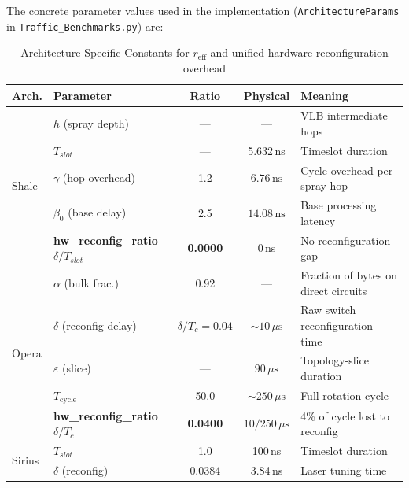 \documentclass{article}
\begin{document}
    \noindent
    The concrete parameter values used in the implementation (\texttt{ArchitectureParams} in \texttt{Traffic\_Benchmarks.py}) are:

    \begin{table}[H]
        \centering
        \caption{Architecture-Specific Constants for $r_{\text{eff}}$ and unified hardware reconfiguration overhead}
        \begin{tabular}{|l|l|c|c|l|}
            \hline
            \textbf{Arch.} & \textbf{Parameter} & \textbf{Ratio} & \textbf{Physical} & \textbf{Meaning} \\
            \hline
            \multirow{5}{*}{Shale}
                & $h$ (spray depth)      & ---                & ---               & VLB intermediate hops \\
                & $T_{slot}$             & ---                & 5.632\,ns         & Timeslot duration \\
                & $\gamma$ (hop overhead)& 1.2                & $6.76\,\text{ns}$ & Cycle overhead per spray hop \\
                & $\beta_0$ (base delay) & 2.5                & $14.08\,\text{ns}$& Base processing latency \\
                & \textbf{hw\_reconfig\_ratio} $\delta/T_{slot}$ & \textbf{0.0000} & 0\,ns & No reconfiguration gap \\
            \hline
            \multirow{5}{*}{Opera}
                & $\alpha$ (bulk frac.)  & 0.92               & ---               & Fraction of bytes on direct circuits \\
                & $\delta$ (reconfig delay)& $\delta/T_c = 0.04$& ${\sim}10\,\mu\text{s}$ & Raw switch reconfiguration time \\
                & $\varepsilon$ (slice)  & ---                & $90\,\mu\text{s}$ & Topology-slice duration \\
                & $T_{\text{cycle}}$     & 50.0               & ${\sim}250\,\mu\text{s}$ & Full rotation cycle \\
                & \textbf{hw\_reconfig\_ratio} $\delta/T_c$    & \textbf{0.0400} & $10/250\,\mu\text{s}$ & 4\% of cycle lost to reconfig \\
            \hline
            \multirow{4}{*}{Sirius}
                & $T_{slot}$                         & 1.0    & 100\,ns           & Timeslot duration \\
                & $\delta$ (reconfig)                & 0.0384 & 3.84\,ns          & Laser tuning time \\

\end{tabular}
\end{table}
\end{document}

